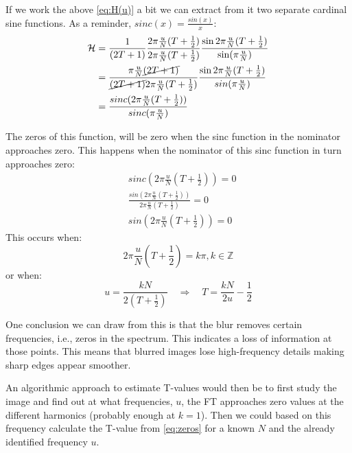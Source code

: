 If we work the above \autoref{eq:H(u)} a bit we can extract from it two separate cardinal sine functions. As a reminder, $sinc(x) = \frac{sin(x)}{x}$:
\begin{equation}
\begin{split}    
    \mathcal{H} &= \frac{1}{(2T +1)} \frac{2 \pi \frac{u}{N}(T + \frac{1}{2})}{2 \pi \frac{u}{N}(T + \frac{1}{2})} \frac{\sin 2 \pi \frac{u}{N}(T + \frac{1}{2})}{\sin ( \pi \frac{u}{N})}
    \\
    &= \frac{\pi\frac{u}{N} \cancel{(2 T +1)}}{\cancel{(2T+1)}  2\pi \frac{u}{N}(T+\frac{1}{2})} 
    \frac{\sin 2 \pi \frac{u}{N}(T + \frac{1}{2})}{sin( \pi \frac{u}{N})}
    \\
    &= \frac{sinc (2 \pi \frac{u}{N}(T + \frac{1}{2}))}{sinc( \pi \frac{u}{N})}
\end{split}
\end{equation}

The zeros of this function, will be zero when the sinc function in the nominator approaches zero. This happens when the nominator of this sinc function in turn approaches zero:
\begin{equation}
\begin{split}
    &sinc (2 \pi \frac{u}{N}(T + \frac{1}{2})) = 0 \\
    & \frac{sin( 2 \pi \frac{u}{N}(T + \frac{1}{2}) )}{2 \pi \frac{u}{N}(T + \frac{1}{2})} = 0 \\
    & sin(2 \pi \frac{u}{N}(T + \frac{1}{2})) = 0
\end{split}
\end{equation}
This occurs when:
\[
2 \pi \frac{u}{N}(T + \frac{1}{2}) = k \pi, k \in \mathbb{Z}
\]
or when:
\begin{equation}
\label{eq:zeros}
u = \frac{k N}{2 (T + \frac{1}{2})}
\quad \Rightarrow \quad
T = \frac{k N}{2 u} - \frac{1}{2} 
\end{equation}

One conclusion we can draw from this is that the blur removes certain frequencies, i.e., zeros in the spectrum. This indicates a loss of information at those points. This means that blurred images lose high-frequency details making sharp edges appear smoother.

An algorithmic approach to estimate T-values would then be to first study the image and find out at what frequencies, $u$, the FT approaches zero values at the different harmonics (probably enough at $k=1$). 
Then we could based on this frequency calculate the T-value from \autoref{eq:zeros} for a known $N$ and the already identified frequency $u$. 


